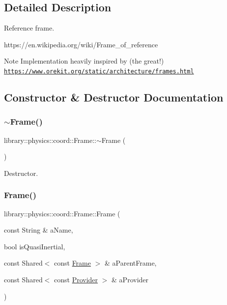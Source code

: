 \subsection{Detailed Description}
Reference frame. 

https\+://en.wikipedia.\+org/wiki/\+Frame\+\_\+of\+\_\+reference \begin{DoxyNote}{Note}
Implementation heavily inspired by (the great!) \href{https://www.orekit.org/static/architecture/frames.html}{\tt https\+://www.\+orekit.\+org/static/architecture/frames.\+html} 
\end{DoxyNote}


\subsection{Constructor \& Destructor Documentation}
\mbox{\label{classlibrary_1_1physics_1_1coord_1_1_frame_a7a4b031eff12e290c0ccacb7d5a47dfd}} 
\subsubsection{\texorpdfstring{$\sim$\+Frame()}{~Frame()}}
{\footnotesize\ttfamily library\+::physics\+::coord\+::\+Frame\+::$\sim$\+Frame (\begin{DoxyParamCaption}{ }\end{DoxyParamCaption})}



Destructor. 

\mbox{\label{classlibrary_1_1physics_1_1coord_1_1_frame_a6a8410c8b29584fe2c2c78370c72f695}} 
\subsubsection{\texorpdfstring{Frame()}{Frame()}\hspace{0.1cm}{\footnotesize\ttfamily [1/2]}}
{\footnotesize\ttfamily library\+::physics\+::coord\+::\+Frame\+::\+Frame (\begin{DoxyParamCaption}\item[{const String \&}]{a\+Name,  }\item[{bool}]{is\+Quasi\+Inertial,  }\item[{const Shared$<$ const \hyperlink{classlibrary_1_1physics_1_1coord_1_1_frame}{Frame} $>$ \&}]{a\+Parent\+Frame,  }\item[{const Shared$<$ const \hyperlink{classlibrary_1_1physics_1_1coord_1_1frame_1_1_provider}{Provider} $>$ \&}]{a\+Provider }\end{DoxyParamCaption})\hspace{0.3cm}{\ttfamily [protected]}}

